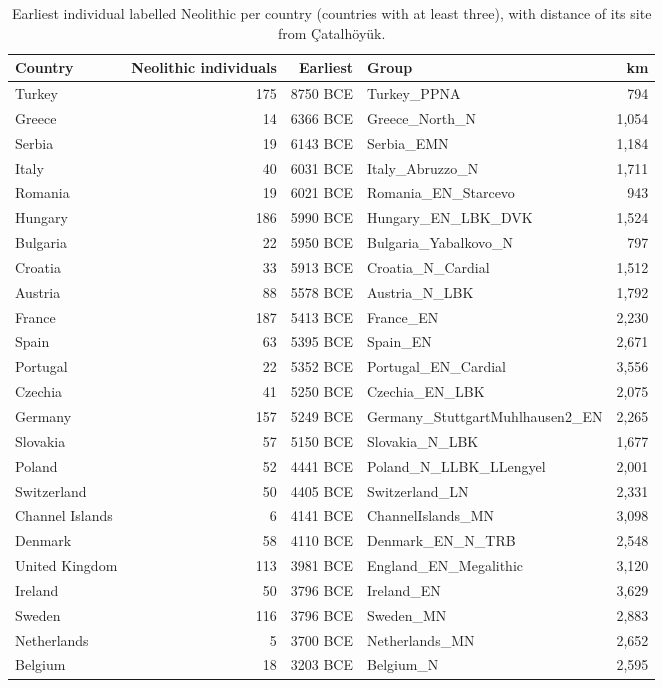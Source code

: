 \documentclass[11pt,a4paper]{article}
\begin{document}
\begin{table}[tbp]\centering\footnotesize\caption{Earliest individual labelled Neolithic per country (countries with at least three), with distance of its site from Çatalhöyük.}\label{tab:neo}\begin{tabular}{lrrlr}\toprule Country & Neolithic individuals & Earliest & Group & km\\\midrule
Turkey & 175 & 8750 BCE & Turkey\_PPNA & 794\\
Greece & 14 & 6366 BCE & Greece\_North\_N & 1,054\\
Serbia & 19 & 6143 BCE & Serbia\_EMN & 1,184\\
Italy & 40 & 6031 BCE & Italy\_Abruzzo\_N & 1,711\\
Romania & 19 & 6021 BCE & Romania\_EN\_Starcevo & 943\\
Hungary & 186 & 5990 BCE & Hungary\_EN\_LBK\_DVK & 1,524\\
Bulgaria & 22 & 5950 BCE & Bulgaria\_Yabalkovo\_N & 797\\
Croatia & 33 & 5913 BCE & Croatia\_N\_Cardial & 1,512\\
Austria & 88 & 5578 BCE & Austria\_N\_LBK & 1,792\\
France & 187 & 5413 BCE & France\_EN & 2,230\\
Spain & 63 & 5395 BCE & Spain\_EN & 2,671\\
Portugal & 22 & 5352 BCE & Portugal\_EN\_Cardial & 3,556\\
Czechia & 41 & 5250 BCE & Czechia\_EN\_LBK & 2,075\\
Germany & 157 & 5249 BCE & Germany\_StuttgartMuhlhausen2\_EN & 2,265\\
Slovakia & 57 & 5150 BCE & Slovakia\_N\_LBK & 1,677\\
Poland & 52 & 4441 BCE & Poland\_N\_LLBK\_LLengyel & 2,001\\
Switzerland & 50 & 4405 BCE & Switzerland\_LN & 2,331\\
Channel Islands & 6 & 4141 BCE & ChannelIslands\_MN & 3,098\\
Denmark & 58 & 4110 BCE & Denmark\_EN\_N\_TRB & 2,548\\
United Kingdom & 113 & 3981 BCE & England\_EN\_Megalithic & 3,120\\
Ireland & 50 & 3796 BCE & Ireland\_EN & 3,629\\
Sweden & 116 & 3796 BCE & Sweden\_MN & 2,883\\
Netherlands & 5 & 3700 BCE & Netherlands\_MN & 2,652\\
Belgium & 18 & 3203 BCE & Belgium\_N & 2,595\\
\bottomrule\end{tabular}\end{table}
\end{document}
